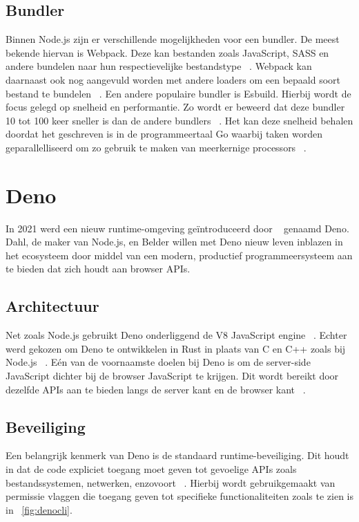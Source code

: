 \subsection{Bundler}
Binnen Node.js zijn er verschillende mogelijkheden voor een bundler. De meest bekende hiervan is Webpack. 
Deze kan bestanden zoals JavaScript, SASS en andere bundelen naar hun respectievelijke bestandstype ~\autocite{Laurila2020}. 
Webpack kan daarnaast ook nog aangevuld worden met andere loaders om een bepaald soort bestand te bundelen ~\autocite{Laurila2020}. Een andere populaire bundler is Esbuild.
Hierbij wordt de focus gelegd op snelheid en performantie. Zo wordt er beweerd dat deze bundler 10 tot 100 keer sneller is dan de andere bundlers ~\autocite{Couriol2020}.
Het kan deze snelheid behalen doordat het geschreven is in de programmeertaal Go waarbij taken worden geparallelliseerd om zo gebruik te maken van meerkernige processors ~\autocite{Couriol2020}.

\section{Deno}
In 2021 werd een nieuw runtime-omgeving geïntroduceerd door ~\textcite{Dahl2021} genaamd Deno.
Dahl, de maker van Node.js, en Belder willen met Deno nieuw leven inblazen in het ecosysteem door middel van een
modern, productief programmeersysteem aan te bieden dat zich houdt aan browser APIs.

\subsection{Architectuur}
Net zoals Node.js gebruikt Deno onderliggend de V8 JavaScript engine ~\autocite{DenoLand2023}. 
Echter werd gekozen om Deno te ontwikkelen in Rust in plaats van C en C++ zoals bij Node.js ~\autocite{DenoLand2023}.
Eén van de voornaamste doelen bij Deno is om de server-side JavaScript dichter bij de browser JavaScript te krijgen.
Dit wordt bereikt door dezelfde APIs aan te bieden langs de server kant en de browser kant ~\autocite{Barrow2022}.

\subsection{Beveiliging}
Een belangrijk kenmerk van Deno is de standaard runtime-beveiliging.
Dit houdt in dat de code expliciet toegang moet geven tot gevoelige APIs zoals bestandssystemen, netwerken, enzovoort ~\autocite{DenoLand2023}. 
Hierbij wordt gebruikgemaakt van permissie vlaggen die toegang geven tot specifieke functionaliteiten zoals te zien is in ~\ref{fig:denocli}.

